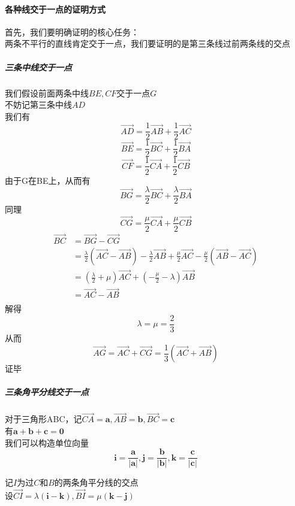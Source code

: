 \documentclass{article}
\newcommand{\ve}{\boldsymbol}
\begin{document}
\begin{CJK}{UTF8}{gkai}
\paragraph{各种线交于一点的证明方式\\}
首先，我们要明确证明的核心任务：\\
两条不平行的直线肯定交于一点，我们要证明的是第三条线过前两条线的交点\\
\subparagraph{三条中线交于一点\\}
我们假设前面两条中线$BE,CF$交于一点$G$\\
不妨记第三条中线$AD$\\
我们有
\[\overrightarrow{AD}=\frac{1}{2}\overrightarrow{AB}+\frac{1}{2}\overrightarrow{AC}\]
\[\overrightarrow{BE}=\frac{1}{2}\overrightarrow{BC}+\frac{1}{2}\overrightarrow{BA}\]
\[\overrightarrow{CF}=\frac{1}{2}\overrightarrow{CA}+\frac{1}{2}\overrightarrow{CB}\]
由于G在BE上，从而有
\[\overrightarrow{BG}=\frac{\lambda}{2}\overrightarrow{BC}+\frac{\lambda}{2}\overrightarrow{BA}\]
同理
\[\overrightarrow{CG}=\frac{\mu}{2}\overrightarrow{CA}+\frac{\mu}{2}\overrightarrow{CB}\]
\[
\begin{aligned}    
\overrightarrow{BC}&=\overrightarrow{BG}-\overrightarrow{CG}\\
&=\frac{\lambda}{2}(\overrightarrow{AC}-\overrightarrow{AB})-\frac{\lambda}{2}\overrightarrow{AB}+\frac{\mu}{2}\overrightarrow{AC}-\frac{\mu}{2}(\overrightarrow{AB}-\overrightarrow{AC})\\
&=(\frac{\lambda}{2}+\mu)\overrightarrow{AC}+(-\frac{\mu}{2}-\lambda)\overrightarrow{AB}\\
&=\overrightarrow{AC}-\overrightarrow{AB}\\
\end{aligned}
\]
解得
\[\lambda=\mu=\frac{2}{3}\]
从而
\[\overrightarrow{AG}=\overrightarrow{AC}+\overrightarrow{CG}=\frac{1}{3}(\overrightarrow{AC}+\overrightarrow{AB})\]
证毕\\
\subparagraph{三条角平分线交于一点\\}
对于三角形ABC，记$\overrightarrow{CA}=\ve{a},\overrightarrow{AB}=\ve{b},\overrightarrow{BC}=\ve{c}$\\
有$\ve{a}+\ve{b}+\ve{c}=\ve{0}$\\

我们可以构造单位向量
\[\ve{i}=\dfrac{\ve{a}}{|\ve{a}|},\ve{j}=\dfrac{\ve{b}}{|\ve{b}|},\ve{k}=\dfrac{\ve{c}}{|\ve{c}|}\]

记$I$为过$C$和$B$的两条角平分线的交点\\
设$\overrightarrow{CI}=\lambda(\ve{i}-\ve{k}),\overrightarrow{BI}=\mu(\ve{k}-\ve{j})$\\


\end{CJK}
\end{document}
